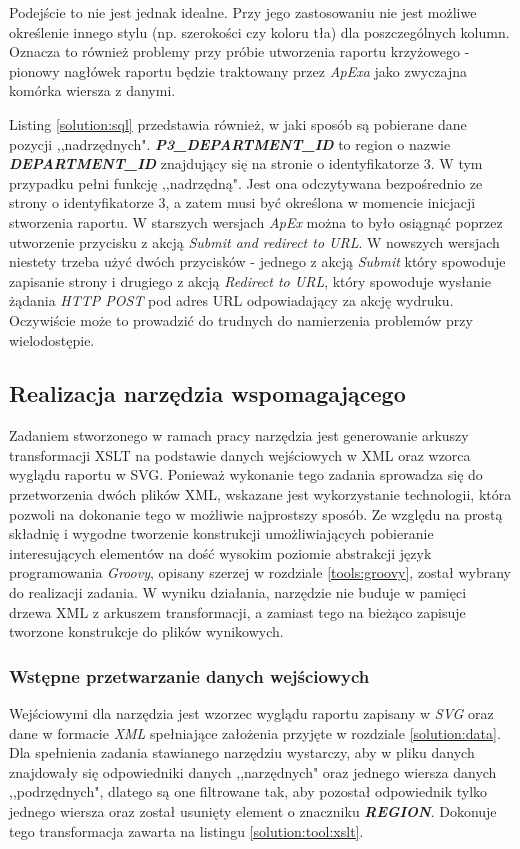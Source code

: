 \documentclass[11pt,a4paper]{article}
\begin{document}
Podejście to nie jest jednak idealne. Przy jego zastosowaniu nie jest możliwe określenie innego stylu (np. szerokości czy koloru tła) dla poszczególnych kolumn. Oznacza to również problemy przy próbie utworzenia raportu krzyżowego - pionowy nagłówek raportu będzie traktowany przez \emph{ApExa} jako zwyczajna komórka wiersza z danymi.

Listing \ref{solution:sql} przedstawia również, w jaki sposób są pobierane dane pozycji ,,nadrzędnych". \textbf{\emph{P3\_DEPARTMENT\_ID}} to region o nazwie \textbf{\emph{DEPARTMENT\_ID}} znajdujący się na stronie o identyfikatorze 3. W tym przypadku pełni funkcję ,,nadrzędną". Jest ona odczytywana bezpośrednio ze strony o identyfikatorze 3, a zatem musi być określona w momencie inicjacji stworzenia raportu. W starszych wersjach \emph{ApEx} można to było osiągnąć poprzez utworzenie przycisku z akcją \emph{Submit and redirect to URL}. W nowszych wersjach niestety trzeba użyć dwóch przycisków - jednego z akcją \emph{Submit} który spowoduje zapisanie strony i drugiego z akcją \emph{Redirect to URL}, który spowoduje wysłanie żądania \emph{HTTP POST} pod adres URL odpowiadający za akcję wydruku. Oczywiście może to prowadzić do trudnych do namierzenia problemów przy wielodostępie. 

\subsection{Realizacja narzędzia wspomagającego} \label{solution:tool}
Zadaniem stworzonego w ramach pracy narzędzia jest generowanie arkuszy transformacji XSLT na podstawie danych wejściowych w XML oraz wzorca wyglądu raportu w SVG. Ponieważ wykonanie tego zadania sprowadza się do przetworzenia dwóch plików XML, wskazane jest wykorzystanie technologii, która pozwoli na dokonanie tego w możliwie najprostszy sposób. Ze względu na prostą składnię i wygodne tworzenie konstrukcji umożliwiających pobieranie interesujących elementów na dość wysokim poziomie abstrakcji język programowania \emph{Groovy}, opisany szerzej w rozdziale \ref{tools:groovy}, został wybrany do realizacji zadania.  W wyniku działania, narzędzie nie buduje w pamięci drzewa XML z arkuszem transformacji, a zamiast tego na bieżąco zapisuje tworzone konstrukcje do plików wynikowych.

\subsubsection{Wstępne przetwarzanie danych wejściowych} \label{solution:tool:input}
Wejściowymi dla narzędzia jest wzorzec wyglądu raportu zapisany w \emph{SVG} oraz dane w formacie \emph{XML} spełniające założenia przyjęte w rozdziale \ref{solution:data}.  Dla spełnienia zadania stawianego narzędziu wystarczy, aby w pliku danych znajdowały się odpowiedniki danych ,,narzędnych" oraz jednego wiersza danych ,,podrzędnych", dlatego są one filtrowane tak, aby pozostał odpowiednik tylko jednego wiersza oraz został usunięty element o znaczniku \emph{\textbf{REGION}}. Dokonuje tego transformacja zawarta na listingu \ref{solution:tool:xslt}.
\end{document}
